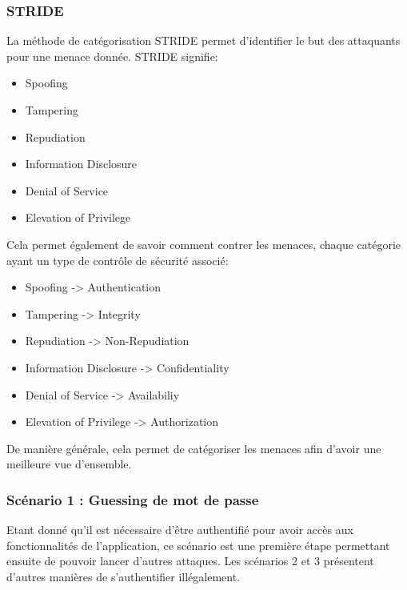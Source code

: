 \documentclass{article}
\begin{document}
\subsubsection{STRIDE}

La méthode de catégorisation STRIDE permet d'identifier le but des
attaquants pour une menace donnée. STRIDE signifie:

\begin{itemize}

\item
  Spoofing
\item
  Tampering
\item
  Repudiation
\item
  Information Disclosure
\item
  Denial of Service
\item
  Elevation of Privilege
\end{itemize}

Cela permet également de savoir comment contrer les menaces, chaque
catégorie ayant un type de contrôle de sécurité associé:

\begin{itemize}

\item
  Spoofing -\textgreater{} Authentication
\item
  Tampering -\textgreater{} Integrity
\item
  Repudiation -\textgreater{} Non-Repudiation
\item
  Information Disclosure -\textgreater{} Confidentiality
\item
  Denial of Service -\textgreater{} Availabiliy
\item
  Elevation of Privilege -\textgreater{} Authorization
\end{itemize}

De manière générale, cela permet de catégoriser les menaces afin d'avoir
une meilleure vue d'ensemble.

\subsubsection{Scénario 1 : Guessing de mot de passe}

Etant donné qu'il est nécessaire d'être authentifié pour avoir accès aux
fonctionnalités de l'application, ce scénario est une première étape
permettant ensuite de pouvoir lancer d'autres attaques. Les scénarios 2
et 3 présentent d'autres manières de s'authentifier illégalement.\\
\end{document}
